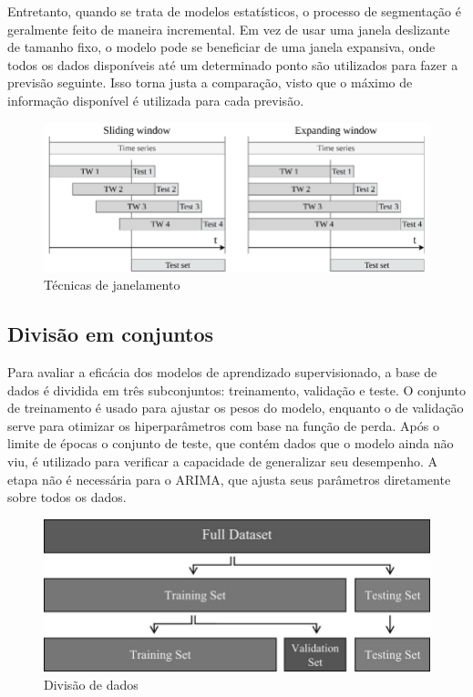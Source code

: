 Entretanto, quando se trata de modelos estatísticos, o processo de segmentação é geralmente feito de maneira incremental.
Em vez de usar uma janela deslizante de tamanho fixo, o modelo pode se beneficiar de uma janela expansiva, onde todos os dados disponíveis até um determinado ponto são utilizados para fazer a previsão seguinte.
Isso torna justa a comparação, visto que o máximo de informação disponível é utilizada para cada previsão.

\begin{figure}[!htb] \centering
    \caption{Técnicas de janelamento} \label{figura:window}
    \begin{varwidth}{\linewidth}
      \includegraphics[width=12cm]{figuras/window.png}
    \end{varwidth}
\end{figure}
  

\subsection{Divisão em conjuntos} \label{sec:divisao}
Para avaliar a eficácia dos modelos de aprendizado supervisionado, a base de dados é dividida em três subconjuntos: treinamento, validação e teste.
O conjunto de treinamento é usado para ajustar os pesos do modelo, enquanto o de validação serve para otimizar os hiperparâmetros com base na função de perda.
Após o limite de épocas o conjunto de teste, que contém dados que o modelo ainda não viu, é utilizado para verificar a capacidade de generalizar seu desempenho. A etapa não é necessária para o ARIMA, que ajusta seus parâmetros diretamente sobre todos os dados.

\begin{figure}[!htb] \centering
    \caption{Divisão de dados} \label{figura:train_test}
    \begin{varwidth}{\linewidth}
      \includegraphics[width=12cm]{figuras/train_test.png}
    \end{varwidth}
\end{figure}

